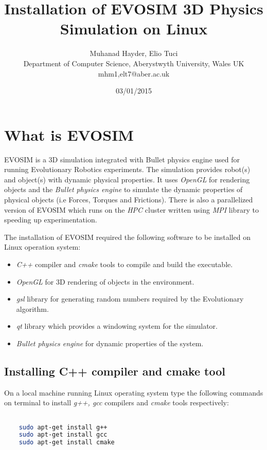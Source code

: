 \documentclass{article}
\begin{document}
\title{Installation of EVOSIM 3D Physics Simulation on Linux}
\author{Muhanad Hayder, Elio Tuci\\
Department of Computer Science, Aberystwyth University, Wales UK\\
mhm1,elt7@aber.ac.uk}

\date{03/01/2015}
\maketitle


\section{What is EVOSIM}
EVOSIM is a 3D simulation integrated with Bullet physics engine used for running Evolutionary Robotics experiments. The simulation provides robot(s) and object(s) with dynamic physical properties. It uses \emph{OpenGL} for rendering objects and the \emph{Bullet physics engine} to simulate the dynamic properties of physical objects (i.e Forces, Torques and Frictions). There is also a parallelized version of EVOSIM which runs on the \emph{HPC} cluster written using \emph{MPI} library to speeding up experimentation. 

The installation of EVOSIM required the following software to be installed on Linux operation system:
\begin{itemize}
\item \emph{C++} compiler and \emph{cmake} tools to compile and build the executable.
\item \emph{OpenGL} for 3D rendering of objects in the environment.
\item \emph{gsl} library for generating random numbers required by the Evolutionary algorithm.
\item \emph{qt} library which provides a windowing system for the simulator.
\item \emph{Bullet physics engine} for dynamic properties of the system.

\end{itemize}
\subsection{Installing C++ compiler and cmake tool}
On a local machine running Linux operating system type the following commands on terminal to install \emph{g++, gcc} compilers and \emph{cmake} tools respectively:
\begin{lstlisting}[language=bash]

	sudo apt-get install g++
	sudo apt-get install gcc
	sudo apt-get install cmake
  
\end{lstlisting}
\end{document}
